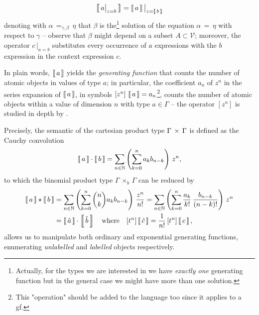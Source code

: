 \begin{definition}[Semantic]
\begin{displaymath}
\begin{split}
    \left\llbracket\,a\big|_{z=b}\,\right\rrbracket &= \left\llbracket\,a\,\right\rrbracket\big|_{z=\left\llbracket\,b\,\right\rrbracket}\\
\end{split}
\end{displaymath}
denoting with $\alpha\,=_{\gamma,\beta}\,\eta$ that $\beta$ is
the\footnote{Actually, for the types we are interested in we have
\textit{exactly one} generating function but in the general case we might have
more than one solution.} solution of the equation $\alpha\,=\,\eta$ with
respect to $\gamma$ -- observe that $\beta$ might depend on a subset
$A\subset\mathcal{V}$; moreover, the operator $c\,\big|_{a=b}$ substitutes
every occurrence of $a$ expressions with the $b$ expression in the context
expression $c$.
\end{definition}

In plain words, $\left\llbracket\,a\,\right\rrbracket$ yields  the \textit{generating function} that
counts the number of atomic objects in values of type $a$; in particular, the
coefficient $a_{n}$ of $z^{n}$ in the series expansion of $\left\llbracket\,a\,\right\rrbracket$, in
symbols $[z^{n}]\,\left\llbracket\,a\,\right\rrbracket = a_{n}$\footnote{This "operation" should be
added to the language too since it applies to a gf.}, counts the number of
atomic objects within a value of dimension $n$ with type $a\in\Gamma$ -- the
operator $[z^{n}]$ is studied in depth by \citet{MSV07}.

Precisely, the semantic of the cartesian product type
$\Gamma\,\times\,\Gamma$ is defined as the Cauchy convolution
\begin{displaymath}
    \left\llbracket\,a\,\right\rrbracket\cdot\left\llbracket\,b\,\right\rrbracket = \sum_{n\in\mathbb{N}}{\left(\sum_{k=0}^{n}{a_{k}b_{n-k}}\right)\,z^{n}},
\end{displaymath}
to which the binomial product type $\Gamma\,\times_{b}\,\Gamma$ can be reduced by
\begin{displaymath}
\begin{split}
    \left\llbracket\,a\,\right\rrbracket\star\left\llbracket\,b\,\right\rrbracket
        &= \sum_{n\in\mathbb{N}}{\left(\sum_{k=0}^{n}{{ {n}\choose{k} }a_{k}b_{n-k}}\right)\,\frac{z^{n}}{n!}}
         = \sum_{n\in\mathbb{N}}{\left(\sum_{k=0}^{n}{\frac{a_{k}}{k!}\,\frac{b_{n-k}}{(n-k)!}}\right)\,z^{n}} \\
        &= \left\llbracket\,\hat{a}\,\right\rrbracket\cdot\left\llbracket\,\hat{b}\,\right\rrbracket \quad\text{where}\quad[t^{n}]\left\llbracket\,\hat{c}\,\right\rrbracket = \frac{1}{n!}\,[t^{n}]\left\llbracket\,c\,\right\rrbracket,
\end{split}
\end{displaymath}
allows us to manipulate both ordinary and exponential generating functions,
enumerating \textit{unlabelled} and \textit{labelled} objects respectively.


